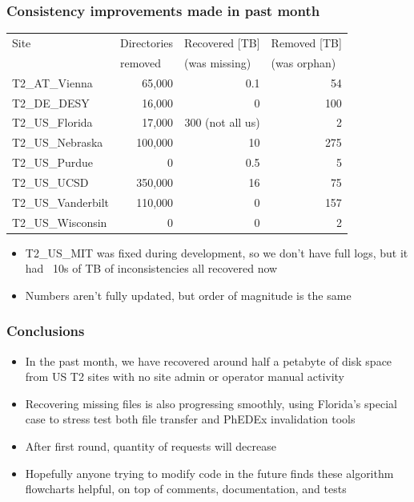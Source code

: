 \documentclass{beamer}
\begin{document}
\begin{frame}
  \frametitle{Consistency improvements made in past month}

  \centering
  {\scriptsize
    \begin{tabular}{l | r | r | r}
      \hline
      Site & \multicolumn{1}{l|}{Directories} & \multicolumn{1}{l|}{Recovered [TB]} & \multicolumn{1}{l}{Removed [TB]} \\
      & \multicolumn{1}{l|}{removed} & \multicolumn{1}{l|}{(was missing)} & \multicolumn{1}{l}{(was orphan)} \\
      \hline
      T2\_AT\_Vienna & 65,000 & 0.1 & 54 \\
      T2\_DE\_DESY & 16,000 & 0 & 100 \\
      T2\_US\_Florida & 17,000 & 300 (not all us) & 2 \\
      T2\_US\_Nebraska & 100,000 & 10 & 275 \\
      \hline
      T2\_US\_Purdue & 0 & 0.5 & 5 \\
      T2\_US\_UCSD & 350,000 & 16 & 75 \\
      T2\_US\_Vanderbilt & 110,000 & 0 & 157 \\
      T2\_US\_Wisconsin & 0 & 0 & 2 \\
      \hline
    \end{tabular}
  }

  \vspace{8pt}
  \begin{itemize}
  \item T2\_US\_MIT was fixed during development, so we don't have full logs,
    but it had ~10s of TB of inconsistencies all recovered now
  \item Numbers aren't fully updated, but order of magnitude is the same
  \end{itemize}

\end{frame}

\begin{frame}
  \frametitle{Conclusions}

  \begin{itemize}
  \item In the past month, we have recovered around half a petabyte of disk space
    from US T2 sites with no site admin or operator manual activity
  \item Recovering missing files is also progressing smoothly,
    using Florida's special case to stress test both file transfer
    and PhEDEx invalidation tools
  \item After first round, quantity of requests will decrease
  \item Hopefully anyone trying to modify code in the future finds these
    algorithm flowcharts helpful, on top of comments, documentation, and tests
  \end{itemize}

\end{frame}
\end{document}
